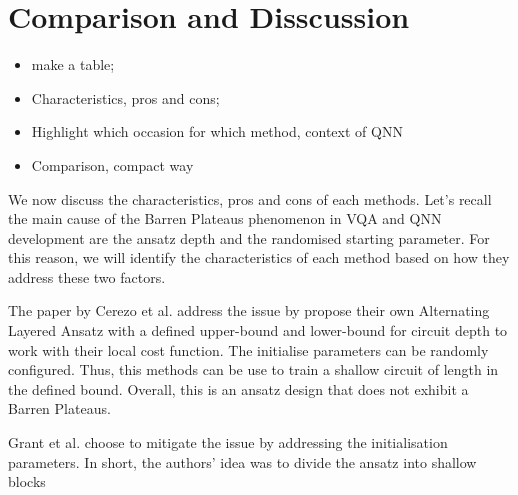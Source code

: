 \section{Comparison and Disscussion}
\begin{itemize}
    \item make a table;
    \item Characteristics, pros and cons;
    \item Highlight which occasion for which method, context of QNN
    \item Comparison, compact way
\end{itemize}

We now discuss the characteristics, pros and cons of each methods.
Let's recall the main cause of the Barren Plateaus phenomenon in VQA and QNN development are the ansatz depth and the randomised starting parameter.
For this reason, we will identify the characteristics of each method based on how they address these two factors.

The paper \cite{cerezoCostFunctionDependent2021} by Cerezo et al. address the issue by propose their own Alternating Layered Ansatz with a defined upper-bound and lower-bound for circuit depth to work with their local cost function. 
The initialise parameters can be randomly configured.
Thus, this methods can be use to train a shallow circuit of length in the defined bound. 
Overall, this is an ansatz design that does not exhibit a Barren Plateaus.

Grant et al. \cite{grantInitializationStrategyAddressing2019} choose to mitigate the issue by addressing the initialisation parameters. In short, the authors' idea was to divide the ansatz into shallow blocks